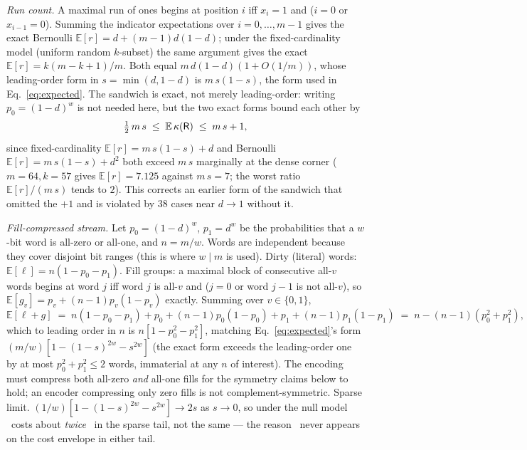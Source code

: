 \emph{Run count.} A maximal run of ones begins at position $i$ iff $x_i=1$ and ($i=0$ or $x_{i-1}=0$).
Summing the indicator expectations over $i=0,\dots,m-1$ gives the exact Bernoulli
$\mathbb{E}[r]=d+(m-1)d(1-d)$; under the fixed-cardinality model (uniform random $k$-subset) the same
argument gives the exact $\mathbb{E}[r]=k(m-k+1)/m$. Both equal $m\,d(1-d)(1+O(1/m))$, whose
leading-order form in $s=\min(d,1-d)$ is $m\,s(1-s)$, the form used in Eq.~\eqref{eq:expected}.
The sandwich is exact, not merely leading-order: writing $p_0=(1-d)^w$ is not needed here, but
the two exact forms bound each other by
\begin{equation}
\tfrac12\,m\,s \;\le\; \mathbb{E}\,\kappa(\textsf{R}) \;\le\; m\,s+1,
\label{eq:s3-corA-sandwich}
\end{equation}
since fixed-cardinality $\mathbb{E}[r]=m\,s(1-s)+d$ and Bernoulli $\mathbb{E}[r]=m\,s(1-s)+d^2$ both
exceed $m\,s$ marginally at the dense corner ($m=64,k=57$ gives $\mathbb{E}[r]=7.125$ against
$m\,s=7$; the worst ratio $\mathbb{E}[r]/(m\,s)$ tends to $2$). This corrects an earlier form of the
sandwich that omitted the $+1$ and is violated by $38$ cases near $d\to1$ without it.

\emph{Fill-compressed stream.} Let $p_0=(1-d)^w$, $p_1=d^w$ be the probabilities that a $w$-bit word is
all-zero or all-one, and $n=m/w$. Words are independent because they cover disjoint bit ranges (this
is where $w\mid m$ is used). Dirty (literal) words: $\mathbb{E}[\ell]=n(1-p_0-p_1)$. Fill groups: a
maximal block of consecutive all-$v$ words begins at word $j$ iff word $j$ is all-$v$ and ($j=0$ or
word $j-1$ is not all-$v$), so $\mathbb{E}[g_v]=p_v+(n-1)p_v(1-p_v)$ exactly. Summing over
$v\in\{0,1\}$,
\begin{equation}
\mathbb{E}[\ell+g] \;=\; n(1-p_0-p_1) + p_0+(n-1)p_0(1-p_0) + p_1+(n-1)p_1(1-p_1)
\;=\; n-(n-1)(p_0^2+p_1^2),
\label{eq:s3-wah-exact}
\end{equation}
which to leading order in $n$ is $n[1-p_0^2-p_1^2]$, matching Eq.~\eqref{eq:expected}'s form
$(m/w)[1-(1-s)^{2w}-s^{2w}]$ (the exact form exceeds the leading-order one by at most
$p_0^2+p_1^2\le2$ words, immaterial at any $n$ of interest). The encoding must compress both all-zero
\emph{and} all-one fills for the symmetry claims below to hold; an encoder compressing only zero fills
is not complement-symmetric. Sparse limit.
$(1/w)[1-(1-s)^{2w}-s^{2w}]\to2s$ as $s\to0$, so under the null model \rW\ costs about \emph{twice} \rS\
in the sparse tail, not the same --- the reason \rW\ never appears on the cost envelope in either tail.

